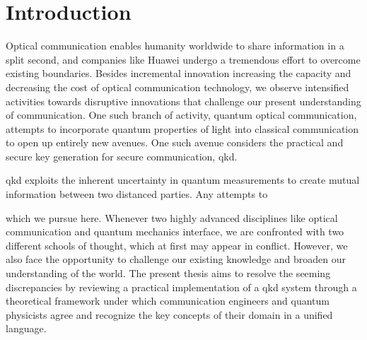 \chapter*{Introduction}

Optical communication enables humanity worldwide to share information in a split second, and companies like Huawei undergo a tremendous effort to overcome existing boundaries.
Besides incremental innovation increasing the capacity and decreasing the cost of optical communication technology, we observe intensified activities towards disruptive innovations that challenge our present understanding of communication.
One such branch of activity, quantum optical communication, attempts to incorporate quantum properties of light into classical communication to open up entirely new avenues.
One such avenue considers the practical and secure key generation for secure communication, \gls{qkd}.

\gls{qkd} exploits the inherent uncertainty in quantum measurements to create mutual information between two distanced parties.
Any attempts to 



which we pursue here.
Whenever two highly advanced disciplines like optical communication and quantum mechanics interface, we are confronted with two different schools of thought, which at first may appear in conflict.
However, we also face the opportunity to challenge our existing knowledge and broaden our understanding of the world.
The present thesis aims to resolve the seeming discrepancies by reviewing a practical implementation of a \gls{qkd} system through a theoretical framework under which communication engineers and quantum physicists agree and recognize the key concepts of their domain in a unified language.


